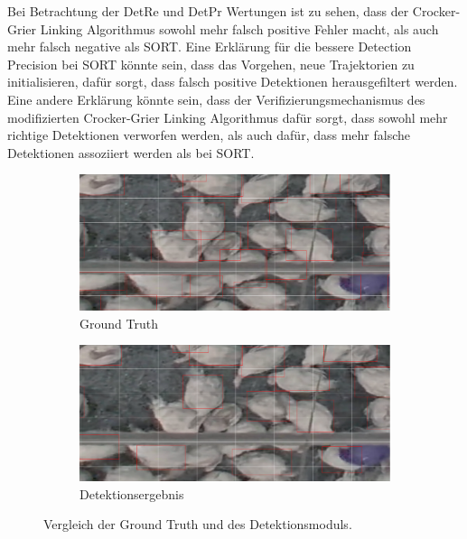 Bei Betrachtung der DetRe und DetPr Wertungen ist zu sehen, dass der Crocker-Grier Linking Algorithmus sowohl mehr falsch positive Fehler macht, als auch mehr falsch negative als SORT. Eine Erklärung für die bessere Detection Precision bei SORT könnte sein, dass das Vorgehen, neue Trajektorien zu initialisieren, dafür sorgt, dass falsch positive Detektionen herausgefiltert werden. Eine andere Erklärung könnte sein, dass der Verifizierungsmechanismus des modifizierten Crocker-Grier Linking Algorithmus dafür sorgt, dass sowohl mehr richtige Detektionen verworfen werden, als auch dafür, dass mehr falsche Detektionen assoziiert werden als bei SORT. \par

\begin{figure}
    \begin{center}
        \vspace*{-9mm}
        \begin{subfigure}[b]{0.5\textwidth}
             \centering
             \includegraphics[width=\textwidth]{img/Vergleich GT_Track GT.png}
             \caption{Ground Truth}
         \end{subfigure}
         \hfill
         \begin{subfigure}[b]{0.5\textwidth}
             \centering         
             \includegraphics[width=\textwidth]{img/Vergleich GT_Track Tracking.png}
             \caption{Detektionsergebnis}
         \end{subfigure}
        \vspace*{-10mm}
        \caption{Vergleich der Ground Truth und des Detektionsmoduls.}
        \label{fig:GTvsDetsComp}
    \end{center}
\end{figure}

